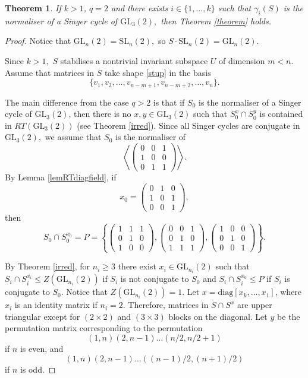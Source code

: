 \documentclass[a4paper,reqno,11pt]{amsart}
\newtheorem{Th}{Theorem}[section]
\theoremstyle{definition}
\theoremstyle{remark}
\numberwithin{equation}{section}
\newcommand{\diag}{\mathrm{diag}}
\newcommand{\Reg}{\mathrm{Reg}}
\newcommand{\SL}{{\mathrm{SL}}}
\newcommand{\GL}{{\mathrm{GL}}}
\begin{document}
\begin{Th}
\label{lem42}
If $k>1$,  $q=2$ and  there exists  $i \in \{1, \ldots, k\}$ such that $\gamma_i(S)$ is the normaliser of a Singer cycle of $\GL_3(2),$ then Theorem {\rm \ref{theorem}} holds.
\end{Th} 
\begin{proof}
Notice that $\GL_n(2)=\SL_n(2),$ so $S \cdot \SL_n(2)=\GL_n(2).$  %


Since $k>1,$ $S$ stabilises a nontrivial invariant subspace $U$ of dimension $m<n$. Assume that matrices in $S$ take shape \eqref{stup} in the  basis $$\{v_1, v_2, \ldots, v_{n-m+1}, v_{n-m+2}, \ldots, v_n \}.$$

The main difference from the case $q>2$ is  that if $S_0$ is the normaliser of a Singer cycle of $\GL_3(2)$, then there is no $x, y \in \GL_3(2)$ such that $S_0^{x} \cap S_0^{y}$ is contained in $RT(\GL_3(2))$ (see Theorem \ref{irred}). Since all Singer cycles are conjugate in $\GL_3(2),$ we assume that $S_0$ is the normaliser of $$
\left\langle
\begin{pmatrix}
0&0&1\\
1&0&0\\
0&1&1
\end{pmatrix}
 \right\rangle.
$$ By Lemma \ref{lemRTdiagfield}, if $$x_0=\begin{pmatrix}
0&1&0\\
1&0&1\\
0&0&1
\end{pmatrix},
$$ then 
\begin{equation*}
S_0 \cap S_0^{x_0} = P =  \left\{
\begin{pmatrix}
1 & 1& 1\\
0& 1 & 0\\
1 & 0 & 0
\end{pmatrix},
\begin{pmatrix}
0 & 0& 1\\
0& 1 & 0\\
1 & 1 & 1
\end{pmatrix},
\begin{pmatrix}
1 & 0& 0\\
0& 1 & 0\\
0 & 0 & 1
\end{pmatrix} \right\}. 
\end{equation*} 


By Theorem \ref{irred}, for $n_i \ge 3$   there exist $x_i\in \GL_{n_i}(2)$ such that $S_i \cap S_i^{x_i} \le Z(\GL_{n_i}(2))$ if $S_i$ is not conjugate to $S_0$ and $S_i \cap S_i^{x_0} \le P$ if $S_i$ is conjugate to $S_0$. Notice that $Z(\GL_{n_i}(2))=1.$  Let $x=\diag[x_k, \ldots, x_1]$, where $x_i$ is an identity matrix if $n_i = 2.$  Therefore, matrices in $S \cap S^x$ are upper triangular except for $(2 \times 2)$ and  $(3 \times 3)$ blocks on the diagonal. Let $y$ be the permutation matrix corresponding to the permutation $$(1,n)(2, n-1) \ldots (n/2, n/2+1)$$ if $n$ is even, and $$(1,n)(2, n-1) \ldots ((n-1)/2, (n+1)/2)$$ if $n$ is odd.


\end{proof}
\end{document}
